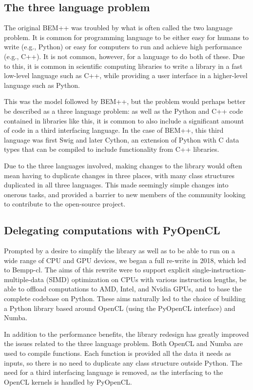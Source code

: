 \documentclass{IEEEcsmag}
\begin{document}
\subsection{The three language problem}
The original BEM++ was troubled by what is often called the two language problem. It is common for programming language to be either easy for humans to write (e.g., Python) or easy for computers to run and achieve high performance (e.g., C++). It is not common, however, for a language to do both of these. Due to this, it is common in scientific computing libraries to write a library in a fast low-level language such as C++, while providing a user interface in a higher-level language such as Python.

This was the model followed by BEM++, but the problem would perhaps better be described as a three language problem: as well as the Python and C++ code contained in libraries like this, it is common to also include a significant amount of code in a third interfacing language. In the case of BEM++, this third language was first Swig and later Cython, an extension of Python with C data types that can be compiled to include functionality from C++ libraries.

Due to the three languages involved, making changes to the library would often mean having to duplicate changes in three places, with many class structures duplicated in all three languages. This made seemingly simple changes into onerous tasks, and provided a barrier to new members of the community looking to contribute to the open-source project.

\subsection{Delegating computations with PyOpenCL}
Prompted by a desire to simplify the library as well as to be able to run on a wide range of CPU and GPU devices, we began a full re-write in 2018, which led to Bempp-cl. The aims of this rewrite were to support explicit single-instruction-multiple-data (SIMD) optimization on CPUs with various instruction lengths, be able to offload computations to AMD, Intel, and Nvidia GPUs, and to base the complete codebase on Python. These aims naturally led to the choice of building a Python library based around OpenCL (using the PyOpenCL interface) and Numba.

In addition to the performance benefits, the library redesign has greatly improved the issues related to the three language problem. Both OpenCL and Numba are used to compile functions. Each function is provided all the data it needs as inputs, so there is no need to duplicate any class structure outside Python. The need for a third interfacing language is removed, as the interfacing to the OpenCL kernels is handled by PyOpenCL.
\end{document}
